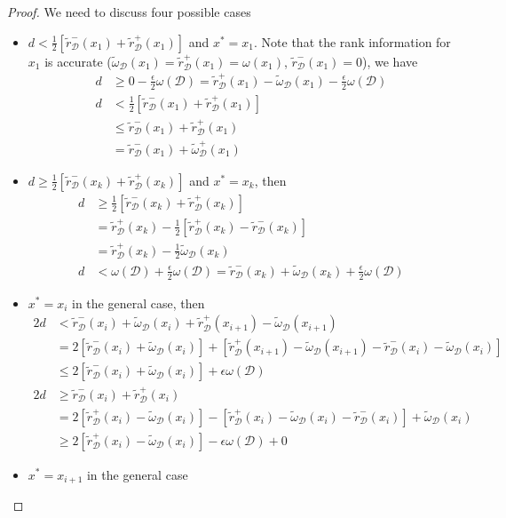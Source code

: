 \documentclass{sig-alternate-05-2015}
\newcommand{\eps}{\epsilon}
\newcommand{\w}{\omega}
\newcommand{\sD}{\mathcal{D}}
\newcommand{\tdr}{\tilde{r}_{\sD}}
\newcommand{\tdw}{\tilde{\omega}_{\sD}}
\begin{document}
\begin{proof}
We need to discuss four possible cases
\begin{itemize}
\item $d < \frac{1}{2}[\tdr^-(x_1) + \tdr^+(x_1) ]$ and $x^* = x_1$. Note that the rank information for $x_1$ is accurate
($\tdw(x_1) = \tdr^+(x_1) = \w(x_1)$, $\tdr^-(x_1)=0$), we have
\begin{equation*}
\begin{split}
 d &\geq 0 - \frac{\eps}{2} \w(\sD) =  \tdr^+(x_1) - \tdw(x_1) - \frac{\eps}{2} \w(\sD) \\
 d &< \frac{1}{2}[\tdr^-(x_1) + \tdr^+(x_1) ]\\
 &\leq \tdr^-(x_1) + \tdr^+(x_1)\\
 &= \tdr^-(x_1) + \tdw^+(x_1)
\end{split}
\end{equation*}
\item $d \geq \frac{1}{2}[\tdr^-(x_k) + \tdr^+(x_k) ]$ and $x^* = x_k$, then
\begin{equation*}
\begin{split}
 d &\geq \frac{1}{2}[\tdr^-(x_k) + \tdr^+(x_k) ]\\
 & = \tdr^+(x_k) - \frac{1}{2}[\tdr^+(x_k) - \tdr^-(x_k)] \\
   &= \tdr^+(x_k) - \frac{1}{2} \tdw(x_k)\\
 d &< \w(\sD) + \frac{\eps}{2} \w(\sD) = \tdr^-(x_k) +\tdw(x_k) + \frac{\eps}{2} \w(\sD)
\end{split}
\end{equation*}
\item $x^* = x_i$ in the general case, then
\begin{equation*}
\begin{split}
2 d  &<  \tdr^-(x_i) + \tdw(x_i) + \tdr^+(x_{i+1}) - \tdw(x_{i+1})\\
&= 2[\tdr^-(x_i) + \tdw(x_i)] + [\tdr^+(x_{i+1}) - \tdw(x_{i+1}) - \tdr^-(x_i) - \tdw(x_i)]\\
&\leq 2[\tdr^-(x_i) + \tdw(x_i)] + \eps \w(\sD)\\
 2 d &\geq \tdr^-(x_i) + \tdr^+(x_i)\\
 & = 2[ \tdr^+(x_i) - \tdw(x_i)] - [\tdr^+(x_i) - \tdw(x_i) - \tdr^-(x_i) ] + \tdw(x_i)\\
 &\geq 2[ \tdr^+(x_i) - \tdw(x_i)] - \eps \w(\sD) + 0
\end{split}
\end{equation*}
\item $x^*=x_{i+1}$ in the general case

\end{itemize}
\end{proof}
\end{document}
